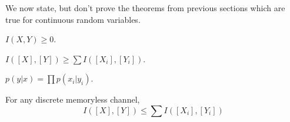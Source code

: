 We now state, but don't prove the theorems from previous sections which are true
for continuous random variables.

\begin{theorem}\label{2.3.4}
    $I(X,Y) \geq 0$.
\end{theorem}

\begin{theorem}\label{2.3.5}
    $I([X],[Y]) \geq \sum{I([X_i],[Y_i])}$.
\end{theorem}

\begin{theorem}\label{2.3.6}
    $p(y|x)=\prod{p(x_i|y_i)}$.
\end{theorem}
\begin{corollary}
    For any discrete memoryless channel,
    \begin{equation*}
        I([X],[Y]) \leq \sum{I([X_i], [Y_i])}
    \end{equation*}
\end{corollary}
